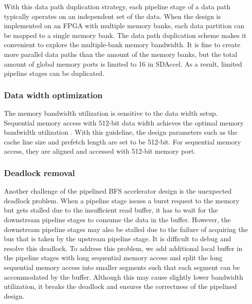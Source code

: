 With this data path duplication strategy, each pipeline stage of a data path typically 
operates on an independent set of the data. When the design is implemented on 
an FPGA with multiple memory banks, each data partition can be mapped to a single memory bank.
The data path duplication scheme makes it convenient to explore the multiple-bank 
memory bandwidth. It is fine to create more parallel data paths than the amount of the memory 
banks, but the total amount of global memory ports is limited to 16 in SDAccel. As a result, 
limited pipeline stages can be duplicated. 

\subsubsection{Data width optimization}
The memory bandwidth utilization is sensitive to the data width setup. 
Sequential memory access with 512-bit data width achieves the optimal 
memory bandwidth utilization \cite{kalms2017exploration}.  
With this guideline, the design parameters such as the cache line size 
and prefetch length are set to be 512-bit. For sequential 
memory access, they are aligned and accessed with 512-bit memory port.


\subsubsection{Deadlock removal}
Another challenge of the pipelined BFS accelerator design is the 
unexpected deadlock problem. 
When a pipeline stage issues a burst request to the memory 
but gets stalled due to the insufficient read buffer, it has to 
wait for the downstream pipeline stages to consume the data in the buffer. 
However, the downstream pipeline stages may also be stalled due to 
the failure of acquiring the bus that is taken by the upstream pipeline stage.
It is difficult to debug and resolve this deadlock. To address this problem, we
add additional local buffer in the pipeline stages with long sequential 
memory access and split the long sequential memory access into smaller 
segments such that each segment can be accommodated by the buffer. 
Although this may cause slightly lower bandwidth utilization, it breaks the deadlock and 
ensures the correctness of the pipelined design.

